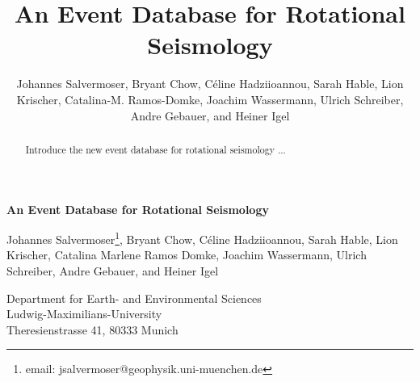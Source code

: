 \documentclass[12pt,reqno,letter]{article} %
\begin{document}
% 

\title{An Event Database for Rotational Seismology}

\author{Johannes Salvermoser, Bryant Chow, C\'{e}line Hadziioannou, Sarah Hable, Lion Krischer, Catalina-M. Ramos-Domke, Joachim Wassermann, Ulrich Schreiber, Andre Gebauer, and Heiner Igel}

% 
% 
% 
% 

\begin{center}

\textbf{An Event Database for Rotational Seismology}

\vspace{6em}
Johannes Salvermoser\footnote{email: jsalvermoser@geophysik.uni-muenchen.de}, Bryant Chow, C\'{e}line Hadziioannou, Sarah Hable, Lion Krischer, Catalina Marlene Ramos Domke, Joachim Wassermann, Ulrich Schreiber, Andre Gebauer, and Heiner Igel
\vspace{3em}

Department for Earth- and Environmental Sciences\\ Ludwig-Maximilians-University\\ Theresienstrasse 41, 80333 Munich



\end{center}

\begin{abstract}
Introduce the new event database for rotational seismology ...

\end{abstract}
% 
% 
% 
% 
\end{document}
